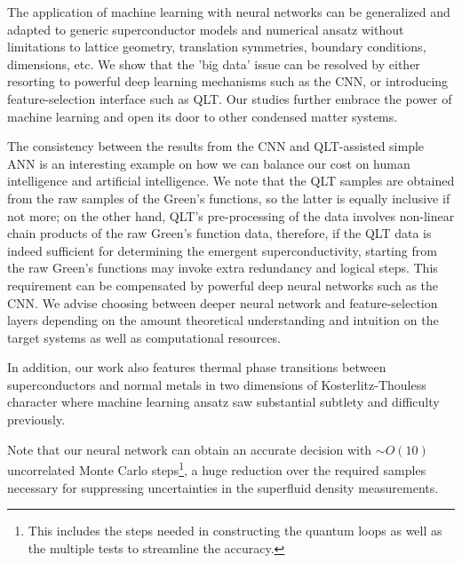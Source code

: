 \documentclass[amsmath,amssymb, aps, prx, longbibliography, twocolumn]{revtex4-1}
\begin{document}
%
The application of machine learning with neural networks can be generalized and adapted to generic superconductor models and numerical ansatz without limitations to lattice geometry, translation symmetries, boundary conditions, dimensions, etc. We show that the 'big data' issue can be resolved by either resorting to powerful deep learning mechanisms such as the CNN, or introducing feature-selection interface such as QLT. Our studies further embrace the power of machine learning and open its door to other condensed matter systems.

The consistency between the results from the CNN and QLT-assisted simple ANN is an interesting example on how we can balance our cost on human intelligence and artificial intelligence. We note that the QLT samples are obtained from the raw samples of the Green's functions, so the latter is equally inclusive if not more; on the other hand, QLT's pre-processing of the data involves non-linear chain products of the raw Green's function data, therefore, if the QLT data is indeed sufficient for determining the emergent superconductivity, starting from the raw Green's functions may invoke extra redundancy and logical steps. This requirement can be compensated by powerful deep neural networks such as the CNN. We advise choosing between deeper neural network and feature-selection layers depending on the amount theoretical understanding and intuition on the target systems as well as computational resources. 

In addition, our work also features thermal phase transitions between superconductors and normal metals in two dimensions of Kosterlitz-Thouless character where machine learning ansatz saw substantial subtlety and difficulty previously\cite{Anna2018}. 

Note that our neural network can obtain an accurate decision with $\sim O(10)$ uncorrelated Monte Carlo steps\footnote{This includes the steps needed in constructing the quantum loops as well as the multiple tests to streamline the accuracy.}, a huge reduction over the required samples necessary for suppressing uncertainties in the superfluid density measurements\cite{Hong2016, Erez2016}. 



\vskip 2cm
\end{document}

